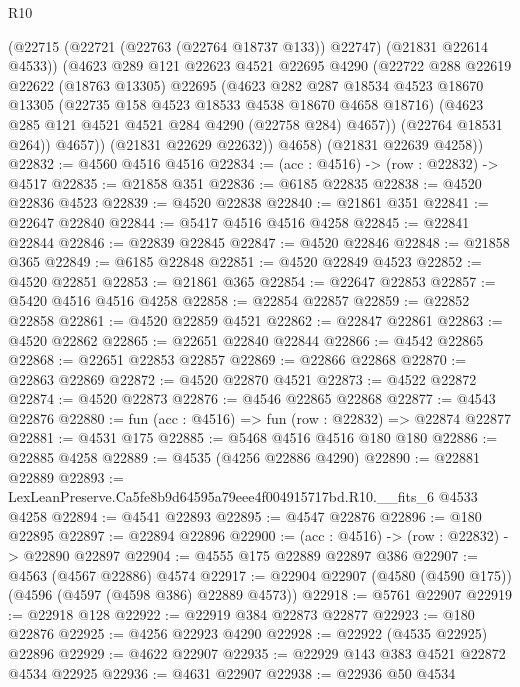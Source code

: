 \begin{lexlean}{R10}
\begin{coremodule}
            (@22715 (@22721 (@22763 (@22764 @18737 @133)) @22747) (@21831 @22614 @4533))
            (@4623
              @289
              @121
              @22623
              @4521
              @22695
              @4290
              (@22722
                @288
                @22619
                @22622
                (@18763 @13305)
                @22695
                (@4623
                  @282
                  @287
                  @18534
                  @4523
                  @18670
                  @13305
                  (@22735 @158 @4523 @18533 @4538 @18670 @4658 @18716)
                  (@4623 @285 @121 @4521 @4521 @284 @4290 (@22758 @284) @4657))
                (@22764 @18531 @264))
              @4657))
          (@21831 @22629 @22632))
        @4658)
      (@21831 @22639 @4258))
@22832 := @4560 @4516 @4516
@22834 := (acc : @4516) -> (row : @22832) -> @4517
@22835 := @21858 @351
@22836 := @6185 @22835
@22838 := @4520 @22836 @4523
@22839 := @4520 @22838
@22840 := @21861 @351
@22841 := @22647 @22840
@22844 := @5417 @4516 @4516 @4258
@22845 := @22841 @22844
@22846 := @22839 @22845
@22847 := @4520 @22846
@22848 := @21858 @365
@22849 := @6185 @22848
@22851 := @4520 @22849 @4523
@22852 := @4520 @22851
@22853 := @21861 @365
@22854 := @22647 @22853
@22857 := @5420 @4516 @4516 @4258
@22858 := @22854 @22857
@22859 := @22852 @22858
@22861 := @4520 @22859 @4521
@22862 := @22847 @22861
@22863 := @4520 @22862
@22865 := @22651 @22840 @22844
@22866 := @4542 @22865
@22868 := @22651 @22853 @22857
@22869 := @22866 @22868
@22870 := @22863 @22869
@22872 := @4520 @22870 @4521
@22873 := @4522 @22872
@22874 := @4520 @22873
@22876 := @4546 @22865 @22868
@22877 := @4543 @22876
@22880 := fun (acc : @4516) => fun (row : @22832) => @22874 @22877
@22881 := @4531 @175
@22885 := @5468 @4516 @4516 @180 @180
@22886 := @22885 @4258
@22889 := @4535 (@4256 @22886 @4290)
@22890 := @22881 @22889
@22893 := LexLeanPreserve.Ca5fe8b9d64595a79eee4f004915717bd.R10.__fits_6 @4533 @4258
@22894 := @4541 @22893
@22895 := @4547 @22876
@22896 := @180 @22895
@22897 := @22894 @22896
@22900 := (acc : @4516) -> (row : @22832) -> @22890 @22897
@22904 := @4555 @175 @22889 @22897 @386
@22907 := @4563 (@4567 @22886) @4574
@22917 := @22904 @22907 (@4580 (@4590 @175)) (@4596 (@4597 (@4598 @386) @22889 @4573))
@22918 := @5761 @22907
@22919 := @22918 @128
@22922 := @22919 @384 @22873 @22877
@22923 := @180 @22876
@22925 := @4256 @22923 @4290
@22928 := @22922 (@4535 @22925) @22896
@22929 := @4622 @22907
@22935 := @22929 @143 @383 @4521 @22872 @4534 @22925
@22936 := @4631 @22907
@22938 := @22936 @50 @4534

\end{coremodule}
\end{lexlean}
